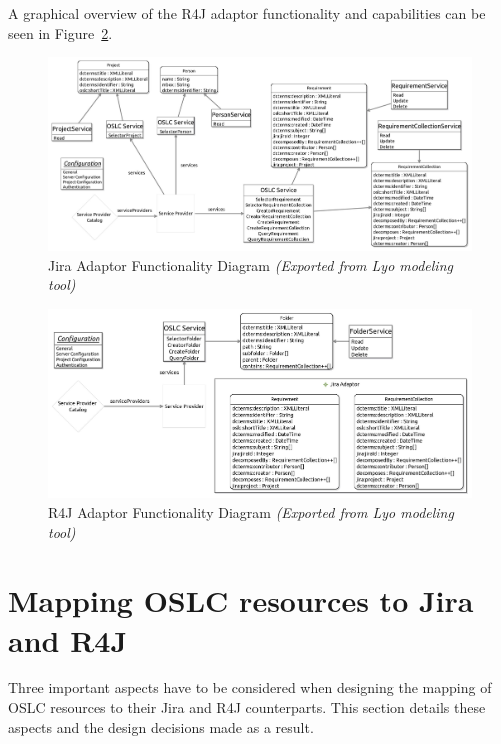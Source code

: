 A graphical overview of the R4J adaptor functionality and capabilities can be seen in Figure \ref{fig:r4j_adaptor_functionality_diagram}.

\begin{figure}[H]
  \centering
  \begin{sideways}
    \includegraphics[width=1.4\linewidth]{figures/JiraInterfaceDiagram.jpg} 
  \end{sideways}
  \caption{Jira Adaptor Functionality Diagram \emph{(Exported from Lyo modeling tool)}}
  \label{fig:jira_adaptor_functionality_diagram}
\end{figure}

\begin{figure}[H]
  \centering
  \begin{sideways}
    \includegraphics[width=1.4\linewidth]{figures/R4JInterfaceDiagram.jpg}
  \end{sideways}
  \caption{R4J Adaptor Functionality Diagram \emph{(Exported from Lyo modeling tool)}}
  \label{fig:r4j_adaptor_functionality_diagram}
\end{figure}

\section{Mapping OSLC resources to Jira and R4J}
Three important aspects have to be considered when designing the mapping of OSLC resources to their Jira and R4J counterparts. This section details these aspects and the design decisions made as a result.

